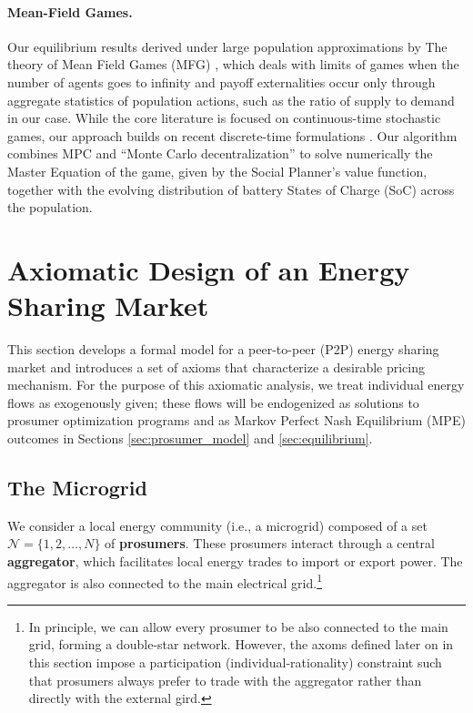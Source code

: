 \documentclass[12pt, notitlepage]{article}
\begin{document}
\paragraph{Mean-Field Games.} Our equilibrium results derived under large population approximations by The theory of Mean Field Games (MFG)  \citep{lasry2007meanfield,GueantLasryLions2011}, which deals with limits of games when the number of agents goes to infinity and payoff externalities occur only through aggregate statistics of population actions, such as the ratio of supply to demand in our case. While the core literature is focused on continuous-time stochastic games, our approach builds on recent discrete-time formulations \citep[e.g.,][]{Doncel_2019,guo2024mf}. Our algorithm combines MPC and ``Monte Carlo decentralization'' to solve numerically the Master Equation of the game, given by the Social Planner's value function, together with the evolving distribution of battery States of Charge (SoC) across the population.

\section{Axiomatic Design of an Energy Sharing Market}
\label{sec:market-design}

This section develops a formal model for a peer-to-peer (P2P) energy sharing market and introduces a set of axioms that characterize a desirable pricing mechanism. For the purpose of this axiomatic analysis, we treat individual energy flows as exogenously given; these flows will be endogenized as solutions to prosumer optimization programs and as Markov Perfect Nash Equilibrium (MPE) outcomes in Sections \ref{sec:prosumer_model} and \ref{sec:equilibrium}.


\subsection{The Microgrid}
We consider a local energy community (i.e., a microgrid) composed of a set $\mathcal{N} = \{1, 2, \dots, N\}$ of \textbf{prosumers}. These prosumers interact through a central \textbf{aggregator}, which facilitates local energy trades to import or export power. The aggregator is also connected to the main electrical grid.\footnote{In principle, we can allow every prosumer to be also connected to the main grid, forming  a double-star network. However, the axoms defined later on in this section impose a participation (individual-rationality) constraint such that prosumers always prefer to trade with the aggregator rather than directly with the external gird.}
\end{document}
